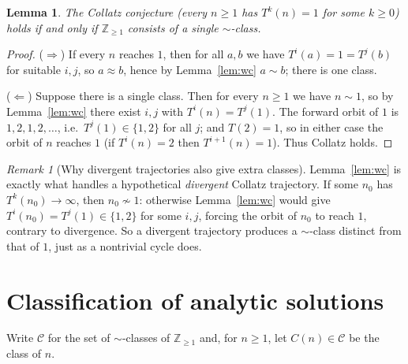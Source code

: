 \documentclass{amsart}
\newtheorem{lemma}{Lemma}
\theoremstyle{remark}
\newtheorem{remark}{Remark}
\begin{document}
\begin{lemma}\label{lem:onesim}
The Collatz conjecture (every $n\ge1$ has $T^k(n)=1$ for some $k\ge0$) holds if and only if
$\mathbb{Z}_{\ge1}$ consists of a single $\sim$-class.
\end{lemma}
\begin{proof}
($\Rightarrow$) If every $n$ reaches $1$, then for all $a,b$ we have $T^i(a)=1=T^j(b)$ for suitable
$i,j$, so $a\approx b$, hence by Lemma~\ref{lem:wc} $a\sim b$; there is one class.

($\Leftarrow$) Suppose there is a single class. Then for every $n\ge1$ we have $n\sim 1$, so by
Lemma~\ref{lem:wc} there exist $i,j$ with $T^i(n)=T^j(1)$. The forward orbit of $1$ is
$1,2,1,2,\dots$, i.e.\ $T^j(1)\in\{1,2\}$ for all $j$; and $T(2)=1$, so in either case the orbit of
$n$ reaches $1$ (if $T^i(n)=2$ then $T^{i+1}(n)=1$). Thus Collatz holds.
\end{proof}

\begin{remark}[Why divergent trajectories also give extra classes]
Lemma~\ref{lem:wc} is exactly what handles a hypothetical \emph{divergent} Collatz trajectory.
If some $n_0$ has $T^k(n_0)\to\infty$, then $n_0\not\sim 1$: otherwise Lemma~\ref{lem:wc} would
give $T^i(n_0)=T^j(1)\in\{1,2\}$ for some $i,j$, forcing the orbit of $n_0$ to reach $1$, contrary
to divergence. So a divergent trajectory produces a $\sim$-class distinct from that of $1$, just as
a nontrivial cycle does.
\end{remark}

\section{Classification of analytic solutions}

Write $\mathcal{C}$ for the set of $\sim$-classes of $\mathbb{Z}_{\ge1}$ and, for $n\ge1$, let
$C(n)\in\mathcal{C}$ be the class of $n$.
\end{document}
